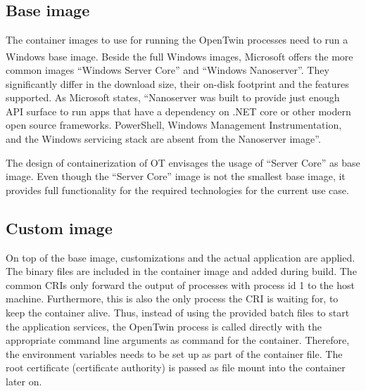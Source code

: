 \subsection{Base image}
The container images to use for running the OpenTwin processes need to run a \ac{Windows} base image. Beside the full \ac{Windows} images, Microsoft\textsuperscript{\tiny\textregistered} offers the more common images \enquote{\ac{Windows} Server Core} and \enquote{\ac{Windows} Nanoserver}\cite{MattbriggsMicrosoft.20230214}. They significantly differ in the download size, their on-disk footprint and the features supported\cite{MattbriggsMicrosoft.20230214}. As Microsoft states, \enquote{Nanoserver was built to provide just enough \ac{API} surface to run apps that have a dependency on .NET core or other modern open source frameworks. PowerShell, Windows Management Instrumentation, and the \ac{Windows} servicing stack are absent from the Nanoserver image}\cite{MattbriggsMicrosoft.20230214}.

The design of containerization of \ac{OT} envisages the usage of \enquote{Server Core} as base image. Even though the \enquote{Server Core} image is not the smallest base image, it provides full functionality for the required technologies for the current use case.


\subsection{Custom image}
On top of the base image, customizations and the actual application are applied. The binary files are included in the container image and added during build. The common \acp{CRI} only forward the output of processes with process id 1 to the host machine. Furthermore, this is also the only process the  \ac{CRI} is waiting for, to keep the container alive. Thus, instead of using the provided batch files to start the application services, the OpenTwin process is called directly with the appropriate command line arguments as command for the container.
Therefore, the environment variables needs to be set up as part of the container file.
The root certificate (certificate authority) is passed as file mount into the container later on.


